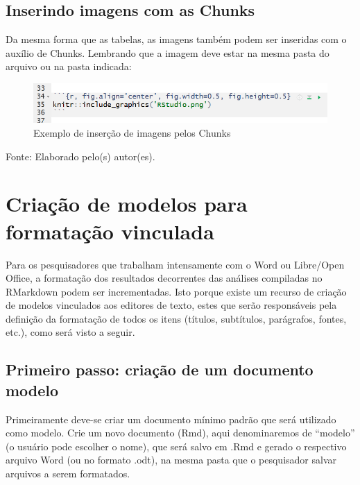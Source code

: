 \documentclass[12pt,brazil,]{book}
\begin{document}
\hypertarget{inserindo-imagens-com-as-chunks}{%
\subsection{Inserindo imagens com as
Chunks}\label{inserindo-imagens-com-as-chunks}}

Da mesma forma que as tabelas, as imagens também podem ser inseridas com
o auxílio de Chunks. Lembrando que a imagem deve estar na mesma pasta do
arquivo ou na pasta indicada:

\begin{figure}

{\centering \includegraphics[width=0.6\linewidth]{rmarkchunkimg} 

}

\caption{Exemplo de inserção de imagens pelos Chunks}\label{fig:rmarkchunk333}
\end{figure}

Fonte: Elaborado pelo(s) autor(es).

\hypertarget{criacao-de-modelos-para-formatacao-vinculada}{%
\section{Criação de modelos para formatação
vinculada}\label{criacao-de-modelos-para-formatacao-vinculada}}

Para os pesquisadores que trabalham intensamente com o Word ou
Libre/Open Office, a formatação dos resultados decorrentes das análises
compiladas no RMarkdown podem ser incrementadas. Isto porque existe um
recurso de criação de modelos vinculados aos editores de texto, estes
que serão responsáveis pela definição da formatação de todos os itens
(títulos, subtítulos, parágrafos, fontes, etc.), como será visto a
seguir.

\hypertarget{primeiro-passo-criacao-de-um-documento-modelo}{%
\subsection{Primeiro passo: criação de um documento
modelo}\label{primeiro-passo-criacao-de-um-documento-modelo}}

Primeiramente deve-se criar um documento mínimo padrão que será
utilizado como modelo. Crie um novo documento (Rmd), aqui denominaremos
de ``modelo'' (o usuário pode escolher o nome), que será salvo em .Rmd e
gerado o respectivo arquivo Word (ou no formato .odt), na mesma pasta
que o pesquisador salvar arquivos a serem formatados.
\end{document}
